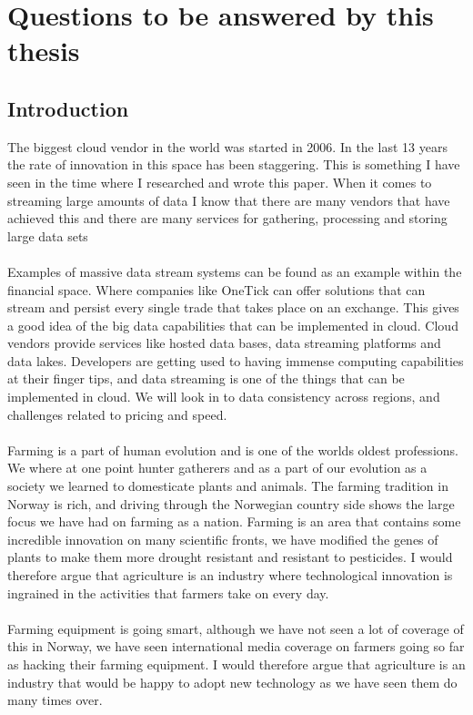\documentclass[]{uiophd}
\begin{document}
\section{Questions to be answered by this thesis}

\subsection{Introduction }
The biggest cloud vendor in the world was started in 2006. In the last 13 years the rate of innovation in this space has been staggering. This is something I have seen in the time where I researched and wrote this paper. When it comes to streaming large amounts of data I know that there are many vendors that have achieved this and there are many services for gathering, processing and storing large data sets
\\\\
Examples of massive data stream systems can be found as an example within the financial space. Where companies like OneTick can offer solutions that can stream and persist every single trade that takes place on an exchange. This gives a good idea of the big data capabilities that can be implemented in cloud. Cloud vendors provide services like hosted data bases, data streaming platforms and data lakes. Developers are getting used to having immense computing capabilities at their finger tips, and data streaming is one of the things that can be implemented in cloud. We will look in to data consistency across regions, and challenges related to pricing and speed.
\\\\
Farming is a part of human evolution and is one of the worlds oldest professions. We where at one point hunter gatherers and as a part of our evolution as a society we learned to domesticate plants and animals. The farming tradition in Norway is rich, and driving through the Norwegian country side shows the large focus we have had on farming as a nation. Farming is an area that contains some incredible innovation on many scientific fronts, we have modified the genes of plants to make them more drought resistant and resistant to pesticides. I would therefore argue that agriculture is an industry where technological innovation is ingrained in the activities that farmers take on every day.
\\\\
Farming equipment is going smart, although we have not seen a lot of coverage of this in Norway, we have seen international media coverage on farmers going so far as hacking their farming equipment. I would therefore argue that agriculture is an industry that would be happy to adopt new technology as we have seen them do many times over.
\end{document}
